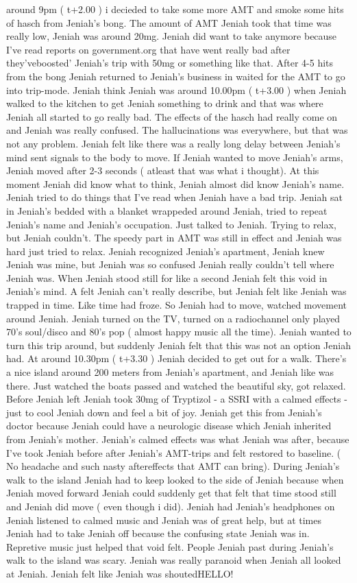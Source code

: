 \documentclass[12pt]{book}
\begin{document}
around 9pm ( t+2.00 ) i decieded to take some more AMT and smoke some hits of hasch from Jeniah's bong. The amount of AMT Jeniah took that time was really low, Jeniah was around 20mg. Jeniah did want to take anymore because I've read reports on government.org that have went really bad after they'veboosted' Jeniah's trip with 50mg or something like that. After 4-5 hits from the bong Jeniah returned to Jeniah's business in waited for the AMT to go into trip-mode. Jeniah think Jeniah was around 10.00pm ( t+3.00 ) when Jeniah walked to the kitchen to get Jeniah something to drink and that was where Jeniah all started to go really bad. The effects of the hasch had really come on and Jeniah was really confused. The hallucinations was everywhere, but that was not any problem. Jeniah felt like there was a really long delay between Jeniah's mind sent signals to the body to move. If Jeniah wanted to move Jeniah's arms, Jeniah moved after 2-3 seconds ( atleast that was what i thought). At this moment Jeniah did know what to think, Jeniah almost did know Jeniah's name. Jeniah tried to do things that I've read when Jeniah have a bad trip. Jeniah sat in Jeniah's bedded with a blanket wrappeded around Jeniah, tried to repeat Jeniah's name and Jeniah's occupation. Just talked to Jeniah. Trying to relax, but Jeniah couldn't. The speedy part in AMT was still in effect and Jeniah was hard just tried to relax. Jeniah recognized Jeniah's apartment, Jeniah knew Jeniah was mine, but Jeniah was so confused Jeniah really couldn't tell where Jeniah was. When Jeniah stood still for like a second Jeniah felt this void in Jeniah's mind. A felt Jeniah can't really describe, but Jeniah felt like Jeniah was trapped in time. Like time had froze. So Jeniah had to move, watched movement around Jeniah. Jeniah turned on the TV, turned on a radiochannel only played 70's soul/disco and 80's pop ( almost happy music all the time). Jeniah wanted to turn this trip around, but suddenly Jeniah felt that this was not an option Jeniah had. At around 10.30pm ( t+3.30 ) Jeniah decided to get out for a walk. There's a nice island around 200 meters from Jeniah's apartment, and Jeniah like was there. Just watched the boats passed and watched the beautiful sky, got relaxed. Before Jeniah left Jeniah took 30mg of Tryptizol - a SSRI with a calmed effects - just to cool Jeniah down and feel a bit of joy. Jeniah get this from Jeniah's doctor because Jeniah could have a neurologic disease which Jeniah inherited from Jeniah's mother. Jeniah's calmed effects was what Jeniah was after, because I've took Jeniah before after Jeniah's AMT-trips and felt restored to baseline. ( No headache and such nasty aftereffects that AMT can bring). During Jeniah's walk to the island Jeniah had to keep looked to the side of Jeniah because when Jeniah moved forward Jeniah could suddenly get that felt that time stood still and Jeniah did move ( even though i did). Jeniah had Jeniah's headphones on Jeniah listened to calmed music and Jeniah was of great help, but at times Jeniah had to take Jeniah off because the confusing state Jeniah was in. Repretive music just helped that void felt. People Jeniah past during Jeniah's walk to the island was scary. Jeniah was really paranoid when Jeniah all looked at Jeniah. Jeniah felt like Jeniah was shoutedHELLO! 
\end{document}
